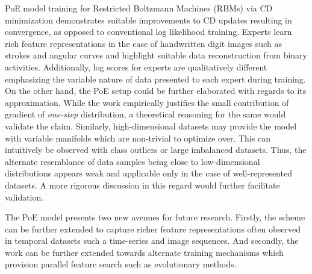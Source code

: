 \documentclass[11pt,letterpaper]{article}
\begin{document}
PoE model training for Restricted Boltzmann Machines (RBMs) via CD minimization demonstrates suitable improvements to CD updates resulting in convergence, as opposed to conventional log likelihood training. Experts learn rich feature representations in the case of handwritten digit images such as strokes and angular curves and highlight suitable data reconstruction from binary activities. Additionally, log scores for experts are qualitatively different emphasizing the variable nature of data presented to each expert during training. On the other hand, the PoE setup could be further elaborated with regards to its approximation. While the work empirically justifies the small contribution of gradient of \textit{one-step} distribution, a theoretical reasoning for the same would validate the claim. Similarly, high-dimensional datasets may provide the model with variable manifolds which are non-trivial to optimize over. This can intuitively be observed with class outliers or large imbalanced datasets. Thus, the alternate resemblance of data samples being close to low-dimensional distributions appears weak and applicable only in the case of well-represented datasets. A more rigorous discussion in this regard would further facilitate validation. 

The PoE model presents two new avenues for future research. Firstly, the scheme can be further extended to capture richer feature representations often observed in temporal datasets such a time-series and image sequences. And secondly, the work can be further extended towards alternate training mechanisms which provision parallel feature search such as evolutionary methods. 
\end{document}
